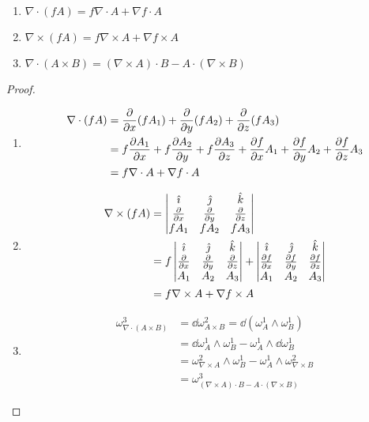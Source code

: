 \begin{property}
    \begin{enumerate}
        \item $\nabla\cdot(fA)=f\nabla\cdot A+\nabla f\cdot A$
        
        \item $\nabla\times(fA)=f\nabla\times A+\nabla f\times A$
        
        \item $\nabla\cdot(A\times B)=(\nabla\times A)\cdot B-A\cdot(\nabla\times B)$
    \end{enumerate}
\end{property}
\begin{proof}
    \begin{enumerate}
        \item 
$$
\begin{aligned}
    \nabla\cdot(fA)&=\frac{\partial{}}{\partial{x}}(fA_1)+\frac{\partial{}}{\partial{y}}(fA_2)+\frac{\partial{}}{\partial{z}}(fA_3)\\
    &=f\frac{\partial{A_1}}{\partial{x}}+f\frac{\partial{A_2}}{\partial{y}}+f\frac{\partial{A_3}}{\partial{z}}+\frac{\partial{f}}{\partial{x}}A_1+\frac{\partial{f}}{\partial{y}}A_2+\frac{\partial{f}}{\partial{z}}{A_3}\\
    &=f\nabla\cdot A+\nabla f\cdot A
\end{aligned}
$$

        \item 
$$
\begin{aligned}
    \nabla\times(fA)&=\begin{vmatrix}
        \hat{\imath} & \hat{\jmath} & \hat{k}\\
        \frac{\partial{}}{\partial{x}} & \frac{\partial{}}{\partial{y}} & \frac{\partial{}}{\partial{z}}\\
        fA_1 & fA_2 & fA_3
    \end{vmatrix}\\
    &=f\begin{vmatrix}
        \hat{\imath} & \hat{\jmath} & \hat{k}\\
        \frac{\partial{}}{\partial{x}} & \frac{\partial{}}{\partial{y}} & \frac{\partial{}}{\partial{z}}\\
        A_1 & A_2 & A_3
    \end{vmatrix}+\begin{vmatrix}
        \hat{\imath} & \hat{\jmath} & \hat{k}\\
        \frac{\partial{f}}{\partial{x}} & \frac{\partial{f}}{\partial{y}} & \frac{\partial{f}}{\partial{z}}\\
        A_1 & A_2 & A_3
    \end{vmatrix}\\
    &=f\nabla\times A+\nabla f\times A
\end{aligned}
$$

        \item
$$
\begin{aligned}
    \omega_{\nabla\cdot(A\times B)}^3&=\dd\omega_{A\times B}^2=\dd(\omega_A^1\wedge\omega_B^1)\\
    &=\dd\omega_A^1\wedge\omega_B^1-\omega_A^1\wedge\dd\omega_B^1\\
    &=\omega_{\nabla\times A}^2\wedge\omega_B^1-\omega_A^1\wedge\omega_{\nabla\times B}^2\\
    &=\omega_{(\nabla\times A)\cdot B-A\cdot(\nabla\times B)}^3
\end{aligned}
$$


\end{enumerate}
\end{proof}
